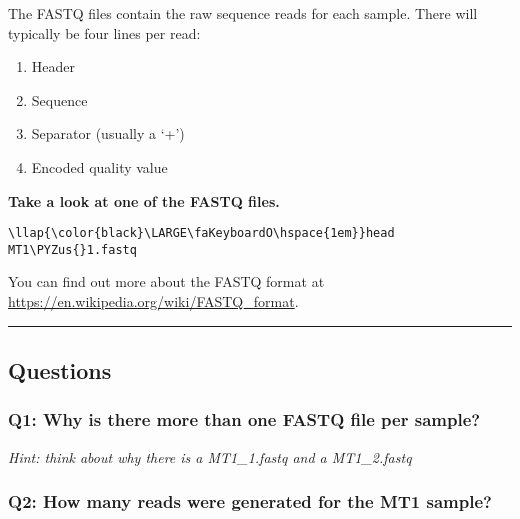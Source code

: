 \documentclass[11pt]{article}
\providecommand{\tightlist}{%
      \setlength{\itemsep}{0pt}\setlength{\parskip}{0pt}}
\def\PYZus{\char`\_}
\begin{document}
    The FASTQ files contain the raw sequence reads for each sample. There
will typically be four lines per read:

\begin{enumerate}
\def\labelenumi{\arabic{enumi}.}
\tightlist
\item
  Header
\item
  Sequence
\item
  Separator (usually a `+')
\item
  Encoded quality value
\end{enumerate}

    \textbf{Take a look at one of the FASTQ files.}





\begin{terminalinput}
\begin{Verbatim}[commandchars=\\\{\}]
\llap{\color{black}\LARGE\faKeyboardO\hspace{1em}}head MT1\PYZus{}1.fastq
\end{Verbatim}
\end{terminalinput}



    You can find out more about the FASTQ format at
\url{https://en.wikipedia.org/wiki/FASTQ_format}.

    \begin{center}\rule{0.5\linewidth}{.4pt}\end{center}

    \hypertarget{questions}{%
\subsection{Questions}\label{questions}}

\hypertarget{q1-why-is-there-more-than-one-fastq-file-per-sample}{%
\subsubsection{Q1: Why is there more than one FASTQ file per
sample?}\label{q1-why-is-there-more-than-one-fastq-file-per-sample}}

\textit{Hint: think about why there is a MT1\_1.fastq and a MT1\_2.fastq}

\hypertarget{q2-how-many-reads-were-generated-for-the-mt1-sample}{%
\subsubsection{Q2: How many reads were generated for the MT1
sample?}\label{q2-how-many-reads-were-generated-for-the-mt1-sample}}
\end{document}
